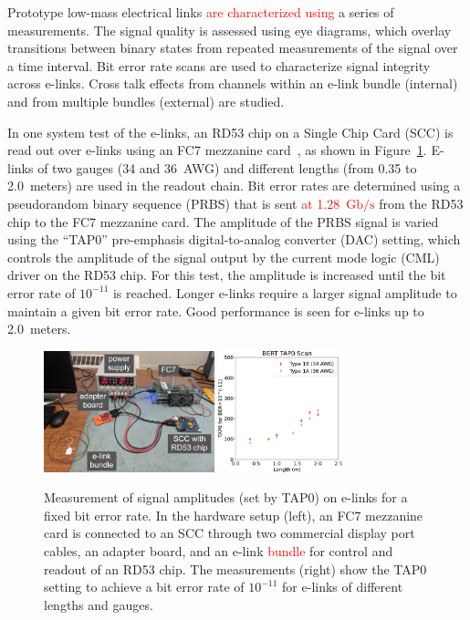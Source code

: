 \documentclass[a4paper,11pt]{article}
\newcommand{\fig}{Figure}
\newcommand{\gbps}{\ensuremath{\mathrm{Gb}/\mathrm{s}}\xspace}
\newcommand{\red}{\textcolor{red}}
\begin{document}

Prototype low-mass electrical links \red{are characterized using} a series of measurements.
The signal quality is assessed using eye diagrams, which overlay transitions between binary states from repeated measurements of the signal over a time interval.
Bit error rate scans are used to characterize signal integrity across e-links.
Cross talk effects from channels within an e-link bundle (internal) and from multiple bundles (external) are studied.


In one system test of the e-links, an RD53 chip on a Single Chip Card (SCC) is read out over e-links using an FC7 mezzanine card~\cite{ref:fc7}, as shown in \fig~\ref{fig:tap0_vs_length}.
E-links of two gauges (34 and 36~AWG) and different lengths (from 0.35 to 2.0~meters) are used in the readout chain.
Bit error rates are determined using a pseudorandom binary sequence (PRBS) that is sent \red{at 1.28~\gbps} from the RD53 chip to the FC7 mezzanine card.
The amplitude of the PRBS signal is varied using the ``TAP0'' pre-emphasis digital-to-analog converter (DAC) setting, which controls the amplitude of the signal output by the current mode logic (CML) driver on the RD53 chip.
For this test, the amplitude is increased until the bit error rate of $10^{-11}$ is reached.
Longer e-links require a larger signal amplitude to maintain a given bit error rate.
Good performance is seen for e-links up to 2.0~meters.

\begin{figure}[htbp]
\centering
\includegraphics[width=0.44\textwidth,origin=c]{../figures/fc7_elink_scc_setup_labeled.jpeg}
\qquad
\includegraphics[width=0.32\textwidth,origin=c]{../figures/BERT_TAP0_vs_Length-crop.pdf}
\caption{
\label{fig:tap0_vs_length}
Measurement of signal amplitudes (set by TAP0) on e-links for a fixed bit error rate.
In the hardware setup (left), an FC7 mezzanine card is connected to an SCC through two commercial display port cables, an adapter board, and an e-link \red{bundle} for control and readout of an RD53 chip.
The measurements (right) show the TAP0 setting to achieve a bit error rate of $10^{-11}$ for e-links of different lengths and gauges.
}
\end{figure}
\end{document}
